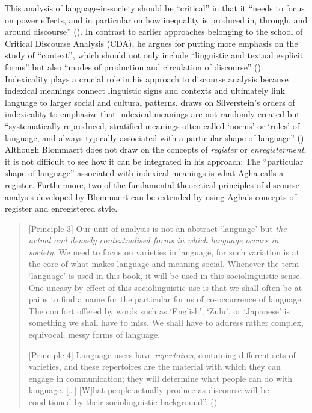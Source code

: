 This analysis of language-in-society should be “critical” in that it “needs to focus on power effects, and in particular on how inequality is produced in, through, and around discourse” (\citeyear[233]{Blommaert2005}). In contrast to earlier approaches belonging to the school of Critical Discourse Analysis (CDA), he argues for putting more emphasis on the study of “context”, which should not only include “linguistic and textual explicit forms” but also “modes of production and circulation of discourse” (\citeyear[233]{Blommaert2005}). Indexicality plays a crucial role in his approach to discourse analysis because indexical meanings connect linguistic signs and contexts and ultimately link language to larger social and cultural patterns. \citet{Blommaert2005} draws on Silverstein’s orders of indexicality to emphasize that indexical meanings are not randomly created but “systematically reproduced, stratified meanings often called ‘norms’ or ‘rules’ of language, and always typically associated with a particular shape of language” (\citeyear[73]{Blommaert2005}). Although Blommaert does not draw on the concepts of \textit{register} or \textit{enregisterment}, it is not difficult to see how it can be integrated in his approach: The “particular shape of language” associated with indexical meanings is what Agha calls a register. Furthermore, two of the fundamental theoretical principles of discourse analysis developed by Blommaert can be extended by using Agha’s concepts of register and enregistered style.


\begin{quote}
[Principle 3] Our unit of analysis is not an abstract ‘language’ but \emph{the actual and densely contextualised forms in which language occurs in society}. We need to focus on varieties in language, for such variation is at the core of what makes language and meaning social. Whenever the term ‘language’ is used in this book, it will be used in this sociolinguistic sense. One uneasy by-effect of this sociolinguistic use is that we shall often be at pains to find a name for the particular forms of co-occurrence of language. The comfort offered by words such as ‘English’, ‘Zulu’, or ‘Japanese’ is something we shall have to miss. We shall have to address rather complex, equivocal, messy forms of language.

[Principle 4] Language users have \emph{repertoires}, containing different sets of varieties, and these repertoires are the material with which they can engage in communication; they will determine what people can do with language. […] [W]hat people actually produce as discourse will be conditioned by their sociolinguistic background”. (\citeyear[15]{Blommaert2005})
\end{quote}


